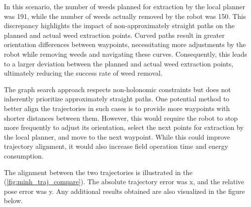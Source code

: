 

In this scenario, the number of weeds planned for extraction by the local planner was 191, while the number of weeds actually removed by the robot was 150. This discrepancy highlights the impact of non-approximately straight paths on the planned and actual weed extraction points. Curved paths result in greater orientation differences between waypoints, necessitating more adjustments by the robot while removing weeds and navigating these curves. Consequently, this leads to a larger deviation between the planned and actual weed extraction points, ultimately reducing the success rate of weed removal.

\vspace*{6mm}   

The graph search approach respects non-holonomic constraints but does not inherently prioritize approximately straight paths. One potential method to better align the trajectories in such cases is to provide more waypoints with shorter distances between them. However, this would require the robot to stop more frequently to adjust its orientation, select the next points for extraction by the local planner, and move to the next waypoint. While this could improve trajectory alignment, it would also increase field operation time and energy consumption.


The alignment between the two trajectories is illustrated in the (\autoref{fig:minh_traj_compare}). The absolute trajectory error was x, and the relative pose error was y. Any additional results obtained are also visualized in the figure below.

